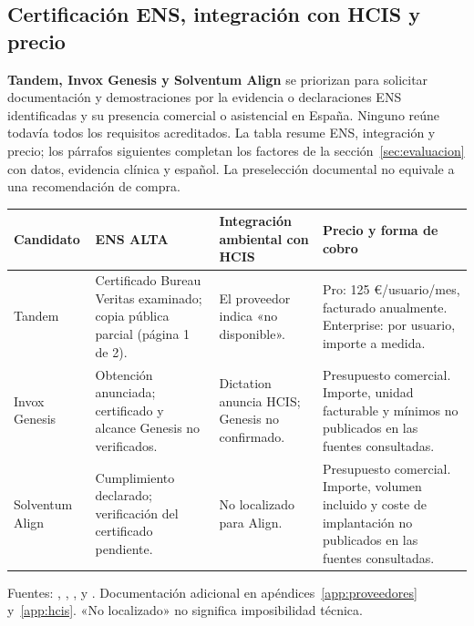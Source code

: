 \subsection{Certificación ENS, integración con HCIS y precio}
\textbf{Tandem, Invox Genesis y Solventum Align} se priorizan para solicitar documentación y demostraciones por la evidencia o declaraciones ENS identificadas y su presencia comercial o asistencial en España. Ninguno reúne todavía todos los requisitos acreditados. La tabla resume ENS, integración y precio; los párrafos siguientes completan los factores de la sección~\ref{sec:evaluacion} con datos, evidencia clínica y español. La preselección documental no equivale a una recomendación de compra.
\begin{small}
\begin{longtable}{L{.14\linewidth}L{.25\linewidth}L{.23\linewidth}L{.26\linewidth}}
\toprule
Candidato & ENS ALTA & Integración ambiental con HCIS & Precio y forma de cobro \\
\midrule\endhead
Tandem & Certificado Bureau Veritas examinado; copia pública parcial (página 1 de 2). & El proveedor indica «no disponible». & Pro: 125 €/usuario/mes, facturado anualmente. Enterprise: por usuario, importe a medida. \\
Invox Genesis & Obtención anunciada; certificado y alcance Genesis no verificados. & Dictation anuncia HCIS; Genesis no confirmado. & Presupuesto comercial. Importe, unidad facturable y mínimos no publicados en las fuentes consultadas. \\
Solventum Align & Cumplimiento declarado; verificación del certificado pendiente. & No localizado para Align. & Presupuesto comercial. Importe, volumen incluido y coste de implantación no publicados en las fuentes consultadas. \\
\bottomrule
\end{longtable}
\end{small}
Fuentes: , , ,  y . Documentación adicional en apéndices~\ref{app:proveedores} y~\ref{app:hcis}. «No localizado» no significa imposibilidad técnica.

